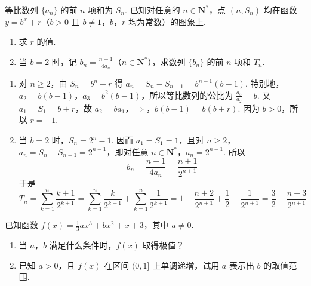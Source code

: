 \begin{problem}
等比数列 \(\{a_{n}\}\) 的前 \(n\) 项和为 \(S_{n}\). 已知对任意的 \(n \in \mathbf{N}^{*}\)，点 \((n, S_{n})\) 均在函数 \(y = b^{x} + r\)（\(b > 0\) 且 \(b \neq 1\)，\(b\)，\(r\) 均为常数）的图象上.

\begin{enumerate}
\item 求 \(r\) 的值.
\item 当 \(b = 2\) 时，记 \(b_{n} = \frac{n + 1}{4a_{n}}\)（\(n \in \mathbf{N}^{*}\)），求数列 \(\{b_{n}\}\) 的前 \(n\) 项和 \(T_{n}\).
\end{enumerate}
\end{problem}

\begin{solution}
\begin{enumerate}
\item 对 \(n\geqslant2\)，由 \(S_n=b^n+r\) 得 \(a_n=S_n-S_{n-1}=b^{n-1}(b-1)\). 特别地，\(a_2=b(b-1)\)，\(a_3=b^2(b-1)\)，所以等比数列的公比为 \(\frac{a_3}{a_2}=b\). 又 \(a_1=S_1=b+r\)，故
\(a_2=ba_1\)，\(\Longrightarrow\)，\(b(b-1)=b(b+r)\).
因为 \(b>0\)，所以 \(r=-1\).

\item 当 \(b=2\) 时，\(S_n=2^n-1\). 因而 \(a_1=S_1=1\)，且对 \(n\geqslant2\)，\(a_n=S_n-S_{n-1}=2^{n-1}\)，即对任意 \(n\in\mathbf N^*\)，\(a_n=2^{n-1}\). 所以
\[
b_n=\frac{n+1}{4a_n}=\frac{n+1}{2^{n+1}}
\]
于是
\[
T_n=\sum_{k=1}^{n}\frac{k+1}{2^{k+1}}=\sum_{k=1}^{n}\frac{k}{2^{k+1}}+\sum_{k=1}^{n}\frac{1}{2^{k+1}}=1-\frac{n+2}{2^{n+1}}+\frac{1}{2}-\frac{1}{2^{n+1}}=\frac{3}{2}-\frac{n+3}{2^{n+1}}
\]
\end{enumerate}
\end{solution}

\begin{problem}
已知函数 \(f(x) = \frac{1}{3}ax^3 + bx^2 + x + 3\)，其中 \(a \neq 0\).

\begin{enumerate}
\item 当 \(a\)，\(b\) 满足什么条件时，\(f(x)\) 取得极值？
\item 已知 \(a > 0\)，且 \(f(x)\) 在区间 \((0,1]\) 上单调递增，试用 \(a\) 表示出 \(b\) 的取值范围.
\end{enumerate}
\end{problem}

